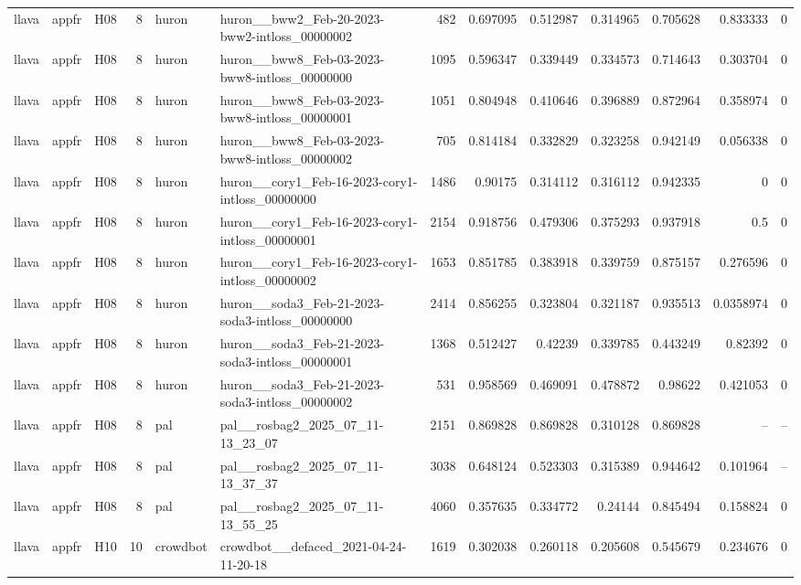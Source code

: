 \begin{longtable}{lllrllrrrrrrr}
llava & appfr & H08 & 8 & huron & huron\_\_bww2\_Feb-20-2023-bww2-intloss\_00000002 & 482 & 0.697095 & 0.512987 & 0.314965 & 0.705628 & 0.833333 & 0 \\
llava & appfr & H08 & 8 & huron & huron\_\_bww8\_Feb-03-2023-bww8-intloss\_00000000 & 1095 & 0.596347 & 0.339449 & 0.334573 & 0.714643 & 0.303704 & 0 \\
llava & appfr & H08 & 8 & huron & huron\_\_bww8\_Feb-03-2023-bww8-intloss\_00000001 & 1051 & 0.804948 & 0.410646 & 0.396889 & 0.872964 & 0.358974 & 0 \\
llava & appfr & H08 & 8 & huron & huron\_\_bww8\_Feb-03-2023-bww8-intloss\_00000002 & 705 & 0.814184 & 0.332829 & 0.323258 & 0.942149 & 0.056338 & 0 \\
llava & appfr & H08 & 8 & huron & huron\_\_cory1\_Feb-16-2023-cory1-intloss\_00000000 & 1486 & 0.90175 & 0.314112 & 0.316112 & 0.942335 & 0 & 0 \\
llava & appfr & H08 & 8 & huron & huron\_\_cory1\_Feb-16-2023-cory1-intloss\_00000001 & 2154 & 0.918756 & 0.479306 & 0.375293 & 0.937918 & 0.5 & 0 \\
llava & appfr & H08 & 8 & huron & huron\_\_cory1\_Feb-16-2023-cory1-intloss\_00000002 & 1653 & 0.851785 & 0.383918 & 0.339759 & 0.875157 & 0.276596 & 0 \\
llava & appfr & H08 & 8 & huron & huron\_\_soda3\_Feb-21-2023-soda3-intloss\_00000000 & 2414 & 0.856255 & 0.323804 & 0.321187 & 0.935513 & 0.0358974 & 0 \\
llava & appfr & H08 & 8 & huron & huron\_\_soda3\_Feb-21-2023-soda3-intloss\_00000001 & 1368 & 0.512427 & 0.42239 & 0.339785 & 0.443249 & 0.82392 & 0 \\
llava & appfr & H08 & 8 & huron & huron\_\_soda3\_Feb-21-2023-soda3-intloss\_00000002 & 531 & 0.958569 & 0.469091 & 0.478872 & 0.98622 & 0.421053 & 0 \\
llava & appfr & H08 & 8 & pal & pal\_\_rosbag2\_2025\_07\_11-13\_23\_07 & 2151 & 0.869828 & 0.869828 & 0.310128 & 0.869828 & -- & -- \\
llava & appfr & H08 & 8 & pal & pal\_\_rosbag2\_2025\_07\_11-13\_37\_37 & 3038 & 0.648124 & 0.523303 & 0.315389 & 0.944642 & 0.101964 & -- \\
llava & appfr & H08 & 8 & pal & pal\_\_rosbag2\_2025\_07\_11-13\_55\_25 & 4060 & 0.357635 & 0.334772 & 0.24144 & 0.845494 & 0.158824 & 0 \\
llava & appfr & H10 & 10 & crowdbot & crowdbot\_\_defaced\_2021-04-24-11-20-18 & 1619 & 0.302038 & 0.260118 & 0.205608 & 0.545679 & 0.234676 & 0 \\

\end{longtable}
